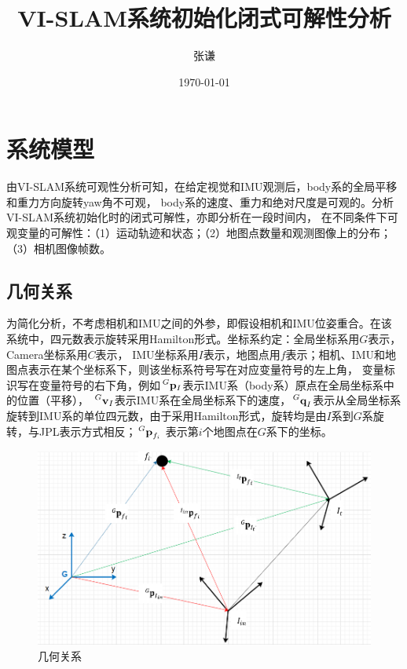 \documentclass{article}
\title{VI-SLAM系统初始化闭式可解性分析}
\author{张谦}
\date{\today}
\begin{document}
\maketitle
\tableofcontents
\newpage

\section{系统模型}
由VI-SLAM系统可观性分析可知，在给定视觉和IMU观测后，body系的全局平移和重力方向旋转yaw角不可观，
body系的速度、重力和绝对尺度是可观的。分析VI-SLAM系统初始化时的闭式可解性，亦即分析在一段时间内，
在不同条件下可观变量的可解性：（1）运动轨迹和状态；（2）地图点数量和观测图像上的分布；（3）相机图像帧数。

\subsection{几何关系}
为简化分析，不考虑相机和IMU之间的外参，即假设相机和IMU位姿重合。在该系统中，四元数表示旋转采用Hamilton形式。坐标系约定：全局坐标系用$G$表示，Camera坐标系用$C$表示，
IMU坐标系用$I$表示，地图点用$f$表示；相机、IMU和地图点表示在某个坐标系下，则该坐标系符号写在对应变量符号的左上角，
变量标识写在变量符号的右下角，例如$\sideset{^G}{}{\mathop{\mathbf{p}_{I}}}$表示IMU系（body系）原点在全局坐标系中的位置（平移），
$\sideset{^G}{}{\mathop{\textbf{v}_{I}}}$表示IMU系在全局坐标系下的速度，$\sideset{^G}{}{\mathop{\textbf{q}_{I}}}$表示从全局坐标系
旋转到IMU系的单位四元数，由于采用Hamilton形式，旋转均是由$I$系到$G$系旋转，与JPL表示方式相反；$\sideset{^G}{}{\mathop{\textbf{p}_{f_i}}}$
表示第$i$个地图点在$G$系下的坐标。
\begin{figure}[ht]
    \centering
    \includegraphics[width=15cm]{figure1.png}
    \caption{几何关系}
    \label{figs:geometryRelation}
\end{figure}
\end{document}
